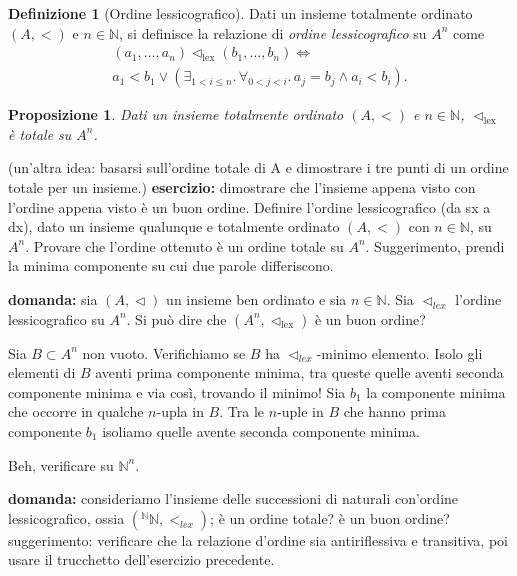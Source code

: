 \documentclass[fontsize = 11 pt, paper=A4, oneside, index=totoc, hyperref]{book}
\theoremstyle{definition}
\newtheorem{dfn}{Definizione}[]
\theoremstyle{plain}
\newtheorem{prp}{Proposizione}[section]
\newcommand{\N}{\mathbb{N}}
\newcommand{\order}{\vartriangleleft}
\newcommand{\ordine}[1]{\vartriangleleft_{\mathrm{#1}}}
\begin{document}
\begin{dfn}[Ordine lessicografico]
  Dati un insieme totalmente ordinato \((A,<)\) e \(n \in \N\), si definisce la relazione di \emph{ordine lessicografico} su \(A^n\) come
  \begin{multline}
    (a_1,\dots,a_n) \ordine{lex} (b_1,\dots,b_n) \iff \\ a_1 < b_1 \lor \left( \exists_{1 < i \le n}.\, \forall_{0 < j < i}.\, a_j = b_j \land a_i < b_i\right).
  \end{multline}
\end{dfn}
\begin{prp}
  Dati un insieme totalmente ordinato \((A, <)\) e \(n \in \N\), \(\ordine{lex}\) è totale su \(A^n\).
\end{prp}
(un'altra idea: basarsi sull'ordine totale di A e dimostrare i tre punti di un ordine totale per un insieme.)
{\bf esercizio:} dimostrare che l'insieme appena visto con l'ordine appena visto è un buon ordine. Definire l'ordine lessicografico (da sx a dx), dato un insieme qualunque e totalmente ordinato \((A, <)\) con \(n \in \N\), su \(A^n\). Provare che l'ordine ottenuto è un ordine totale su \(A^n\). Suggerimento, prendi la minima componente su cui due parole differiscono.

{\bf domanda:} sia \((A, \order)\) un insieme ben ordinato e sia \(n \in \N\). Sia \(\order_{lex}\) l'ordine lessicografico su \(A^n\). Si può dire che \((A^n, \ordine{lex})\) è un buon ordine?

Sia \(B \subset A^n\) non vuoto. Verifichiamo se \(B\) ha \(\order_{lex}\)-minimo elemento. Isolo gli elementi di \(B\) aventi prima componente minima, tra queste quelle aventi seconda componente minima e via così, trovando il minimo! Sia \(b_1\) la componente minima che occorre in qualche \(n\)-upla in \(B\). Tra le \(n\)-uple in \(B\) che hanno prima componente \(b_1\) isoliamo quelle avente seconda componente minima.

Beh, verificare su \(\N^n\).

{\bf domanda:} consideriamo l'insieme delle successioni di naturali con'ordine lessicografico, ossia \(({}^\N\N, <_{lex})\); è un ordine totale? è un buon ordine? suggerimento: verificare che la relazione d'ordine sia antiriflessiva e transitiva, poi usare il trucchetto dell'esercizio precedente.
\end{document}
